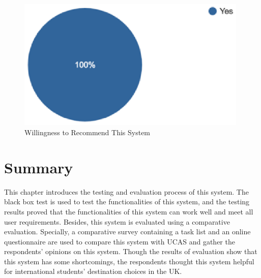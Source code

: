 \begin{figure}[H]
  \centering
  \includegraphics[width=11cm]{./img/Picture30}
  \caption{Willingness to Recommend This System
}
  \label{Figure:figex}
\end{figure}


\section{Summary}

This chapter introduces the testing and evaluation process of this system. The black box test is used to test the functionalities of this system, and the testing results proved that the functionalities of this system can work well and meet all user requirements. Besides, this system is evaluated using a comparative evaluation. Specially, a comparative survey containing a task list and an online questionnaire are used to compare this system with UCAS and gather the respondents’ opinions on this system. Though the results of evaluation show that this system has some shortcomings, the respondents thought this system helpful for international students’ destination choices in the UK.

